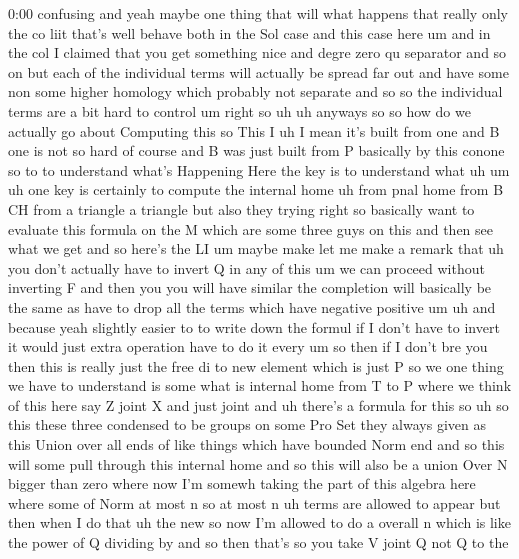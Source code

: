 \begin{unfinished}{0:00}
confusing
and  yeah  maybe  one  thing  that  will  what
happens  that  really  only  the  co  liit
that's  well  behave  both  in  the  Sol  case
and  this  case  here
um  and  in  the  col  I  claimed  that  you  get
something  nice  and  degre  zero  qu
separator  and  so  on  but  each  of  the
individual  terms  will  actually  be
spread  far  out  and  have  some  non  some
higher  homology  which  probably  not
separate  and  so  so  the  individual  terms
are  a  bit  hard  to
control  um  right
so  uh
uh  anyways
so  so  how  do  we  actually  go  about
Computing  this  so  This
I  uh  I  mean  it's  built  from  one  and  B
one  is  not  so  hard  of  course  and  B  was
just  built  from  P  basically  by  this
conone  so  to  to  understand  what's
Happening  Here  the  key  is  to  understand
what
uh
um  uh  one  key  is  certainly  to
compute  the  internal
home  uh  from
pnal  home  from  B  CH  from  a
triangle  a  triangle  but
also  they
trying
right  so  basically  want  to  evaluate  this
formula  on  the  M  which  are  some  three
guys  on  this  and  then  see  what  we
get
and  so  here's  the
LI
um  maybe  make  let  me  make  a  remark  that
uh  you  don't  actually  have  to  invert  Q
in  any  of  this
um  we  can  proceed
without  inverting
F  and  then  you  you  will  have  similar  the
completion  will  basically  be  the  same  as
have  to  drop  all  the  terms  which  have
negative
positive  um
uh  and  because  yeah  slightly  easier  to
to  write  down  the  formul  if  I  don't  have
to  invert  it  would  just  extra  operation
have  to  do  it  every
um  so
then  if  I  don't  bre  you  then  this  is
really  just  the  free  di  to  new  element
which  is  just  P  so  we  one  thing  we  have
to  understand  is  some  what  is  internal
home  from  T  to  P  where  we  think  of  this
here
say  Z  joint  X  and  just
joint  and  uh  there's  a  formula  for
this  so
uh  so  this  these  three  condensed  to  be
groups  on  some  Pro  Set  they  always  given
as  this  Union  over  all  ends  of  like
things  which  have  bounded  Norm  end  and
so  this  will  some  pull  through  this
internal  home  and  so  this  will  also  be  a
union  Over  N  bigger  than
zero  where  now  I'm  somewh  taking  the
part  of  this  algebra  here  where  some  of
Norm  at  most  n  so  at  most
n  uh  terms  are  allowed  to
appear  but  then  when  I  do  that  uh  the
new  so  now  I'm  allowed  to  do  a
overall  n  which  is  like  the  power  of  Q
dividing
by  and  so  then  that's  so  you  take  V
joint
Q  not  Q  to  the

\end{unfinished}
